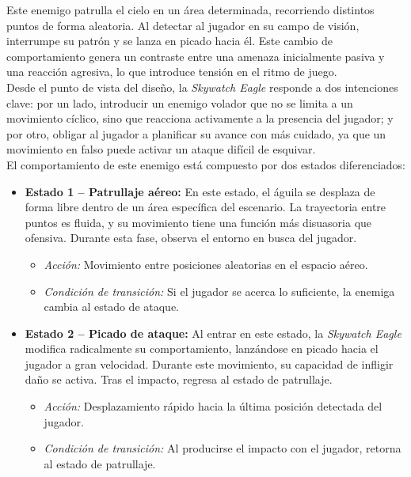 Este enemigo patrulla el cielo en un área determinada, recorriendo distintos puntos de forma aleatoria. Al detectar al jugador en su campo de visión, interrumpe su patrón y se lanza en picado hacia él. Este cambio de comportamiento genera un contraste entre una amenaza inicialmente pasiva y una reacción agresiva, lo que introduce tensión en el ritmo de juego.\\

Desde el punto de vista del diseño, la \textit{Skywatch Eagle} responde a dos intenciones clave: por un lado, introducir un enemigo volador que no se limita a un movimiento cíclico, sino que reacciona activamente a la presencia del jugador; y por otro, obligar al jugador a planificar su avance con más cuidado, ya que un movimiento en falso puede activar un ataque difícil de esquivar.\\

El comportamiento de este enemigo está compuesto por dos estados diferenciados:

\begin{itemize}
    \item \textbf{Estado 1 – Patrullaje aéreo:}  
    En este estado, el águila se desplaza de forma libre dentro de un área específica del escenario. La trayectoria entre puntos es fluida, y su movimiento tiene una función más disuasoria que ofensiva. Durante esta fase, observa el entorno en busca del jugador.

    \begin{itemize}
        \item \textit{Acción:} Movimiento entre posiciones aleatorias en el espacio aéreo.  
        \item \textit{Condición de transición:} Si el jugador se acerca lo suficiente, la enemiga cambia al estado de ataque.
    \end{itemize}

    \item \textbf{Estado 2 – Picado de ataque:}  
    Al entrar en este estado, la \textit{Skywatch Eagle} modifica radicalmente su comportamiento, lanzándose en picado hacia el jugador a gran velocidad. Durante este movimiento, su capacidad de infligir daño se activa. Tras el impacto, regresa al estado de patrullaje.

    \begin{itemize}
        \item \textit{Acción:} Desplazamiento rápido hacia la última posición detectada del jugador.  
        \item \textit{Condición de transición:} Al producirse el impacto con el jugador, retorna al estado de patrullaje.
    \end{itemize}
\end{itemize}

